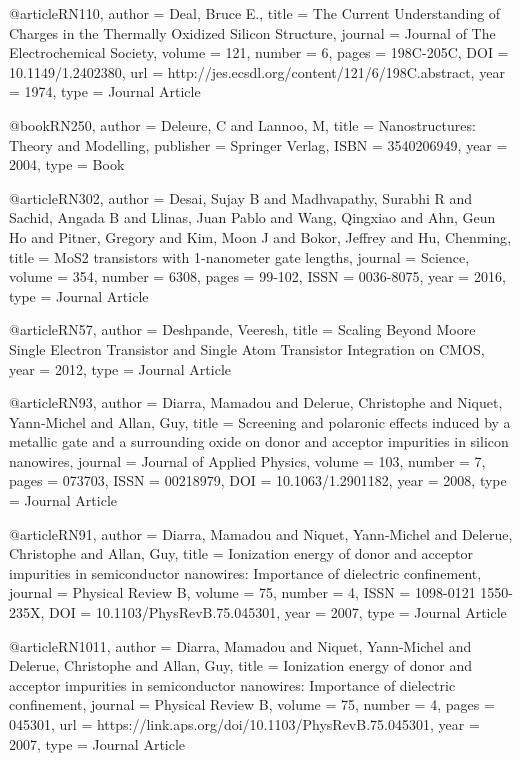 @article{RN110,
   author = {Deal, Bruce E.},
   title = {The Current Understanding of Charges in the Thermally Oxidized Silicon Structure},
   journal = {Journal of The Electrochemical Society},
   volume = {121},
   number = {6},
   pages = {198C-205C},
   DOI = {10.1149/1.2402380},
   url = {http://jes.ecsdl.org/content/121/6/198C.abstract},
   year = {1974},
   type = {Journal Article}
}

@book{RN250,
   author = {Deleure, C and Lannoo, M},
   title = {Nanostructures: Theory and Modelling},
   publisher = {Springer Verlag},
   ISBN = {3540206949},
   year = {2004},
   type = {Book}
}

@article{RN302,
   author = {Desai, Sujay B and Madhvapathy, Surabhi R and Sachid, Angada B and Llinas, Juan Pablo and Wang, Qingxiao and Ahn, Geun Ho and Pitner, Gregory and Kim, Moon J and Bokor, Jeffrey and Hu, Chenming},
   title = {MoS2 transistors with 1-nanometer gate lengths},
   journal = {Science},
   volume = {354},
   number = {6308},
   pages = {99-102},
   ISSN = {0036-8075},
   year = {2016},
   type = {Journal Article}
}

@article{RN57,
   author = {Deshpande, Veeresh},
   title = {Scaling Beyond Moore Single Electron Transistor and Single Atom Transistor Integration on CMOS},
   year = {2012},
   type = {Journal Article}
}

@article{RN93,
   author = {Diarra, Mamadou and Delerue, Christophe and Niquet, Yann-Michel and Allan, Guy},
   title = {Screening and polaronic effects induced by a metallic gate and a surrounding oxide on donor and acceptor impurities in silicon nanowires},
   journal = {Journal of Applied Physics},
   volume = {103},
   number = {7},
   pages = {073703},
   ISSN = {00218979},
   DOI = {10.1063/1.2901182},
   year = {2008},
   type = {Journal Article}
}

@article{RN91,
   author = {Diarra, Mamadou and Niquet, Yann-Michel and Delerue, Christophe and Allan, Guy},
   title = {Ionization energy of donor and acceptor impurities in semiconductor nanowires: Importance of dielectric confinement},
   journal = {Physical Review B},
   volume = {75},
   number = {4},
   ISSN = {1098-0121
1550-235X},
   DOI = {10.1103/PhysRevB.75.045301},
   year = {2007},
   type = {Journal Article}
}

@article{RN1011,
   author = {Diarra, Mamadou and Niquet, Yann-Michel and Delerue, Christophe and Allan, Guy},
   title = {Ionization energy of donor and acceptor impurities in semiconductor nanowires: Importance of dielectric confinement},
   journal = {Physical Review B},
   volume = {75},
   number = {4},
   pages = {045301},
   url = {https://link.aps.org/doi/10.1103/PhysRevB.75.045301},
   year = {2007},
   type = {Journal Article}
}


